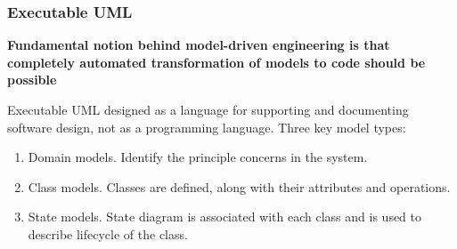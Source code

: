 \documentclass{article}
\begin{document}
\subsubsection{Executable UML}
\textbf{Fundamental notion behind model-driven engineering is that completely automated transformation of models to code should be possible}

Executable UML designed as a language for supporting and documenting software design, not as a programming language.  Three key model types:
\begin{enumerate}
    \item Domain models.  Identify the principle concerns in the system.
    \item Class models.  Classes are defined, along with their attributes and operations.
    \item State models.  State diagram is associated with each class and is used to describe lifecycle of the class.
\end{enumerate}
\end{document}
